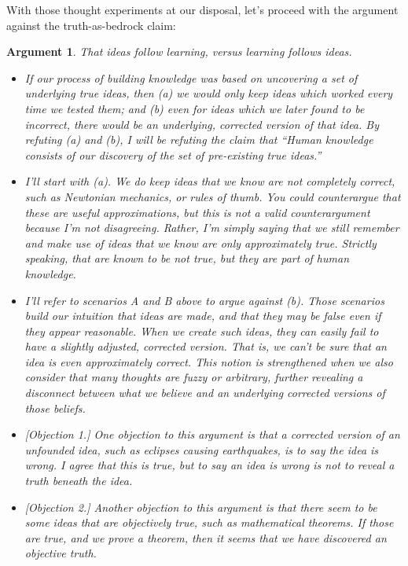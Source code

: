 \documentclass[11pt, oneside]{article}
\theoremstyle{argtstyle}
\newtheorem*{argt}{Argument}
\begin{document}
With those thought experiments at our disposal, let's proceed with
the argument against the truth-as-bedrock claim:
\begin{argt} That ideas follow learning, versus learning follows ideas.
    \label{a7}
    \normalfont
\begin{itemize}
    \item{} If our process of building knowledge was based on uncovering a set
        of underlying true ideas, then (a) we would only keep ideas which worked
        every time we tested them; and (b) even for ideas which we later found
        to be incorrect, there would be an underlying, corrected version of that
        idea. By refuting (a) and (b), I will be refuting the claim that ``Human
        knowledge consists of our discovery of the set of pre-existing true
        ideas.''

    \item{} I'll start with (a). We do keep ideas that we know are not
        completely correct, such as Newtonian mechanics, or rules of thumb.
        You could counterargue that these are useful approximations, but this is
        not a valid counterargument because I'm not disagreeing.
        Rather, I'm simply saying that we still remember and make use of ideas
        that we know are only approximately true. Strictly speaking, that are
        known to be not true, but they are part of human knowledge.

    \item{} I'll refer to scenarios A and B above to argue against (b).
        Those scenarios build our intuition that ideas are {\em made}, and that
        they may be false even if they appear reasonable. When we create such
        ideas, they can easily fail to have a slightly adjusted, corrected
        version. That is, we can't be sure that an idea is
        even approximately correct. This notion is strengthened when we
        also consider that many thoughts are fuzzy or arbitrary, further
        revealing a disconnect between what we believe and an underlying
        corrected versions of those beliefs.

    \item{} [Objection 1.] One objection to this argument is that a corrected
        version of an unfounded idea, such as eclipses causing earthquakes, is
        to say the idea is wrong. I agree that this is true, but to say an idea
        is wrong is not to reveal a truth beneath the idea.

    \item{} [Objection 2.]
        Another objection to this argument is that there seem to be some ideas
        that are objectively true, such as mathematical theorems. If
        those are true, and we prove a theorem, then it seems that we have
        discovered an objective truth.


\end{itemize}
\end{argt}
\end{document}

